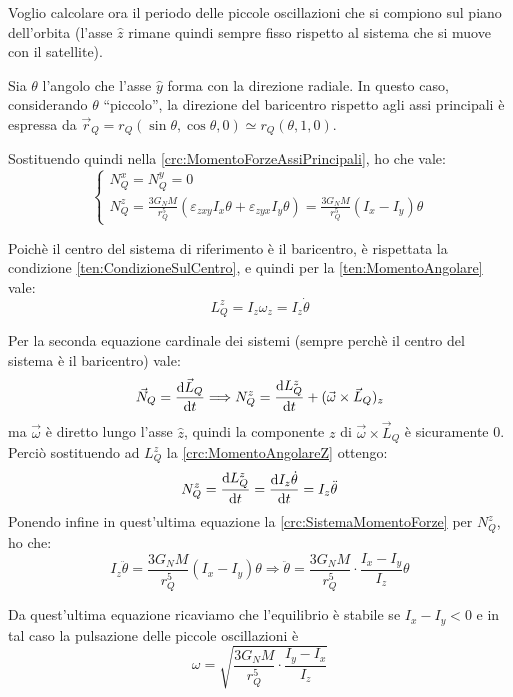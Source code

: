 \documentclass[../main.tex]{subfiles}
\begin{document}
Voglio calcolare ora il periodo delle piccole oscillazioni che si compiono sul piano dell'orbita (l'asse $\hat z$ rimane quindi sempre fisso rispetto al sistema che si muove con il satellite).

Sia $\theta$ l'angolo che l'asse $\hat y$ forma con la direzione radiale. In questo caso, considerando $\theta$ ``piccolo'', la direzione del baricentro rispetto agli assi principali è espressa da $\vec r_Q=r_Q(\sin\theta,\cos\theta,0)\simeq r_Q(\theta,1,0)$.

Sostituendo quindi nella \cref{crc:MomentoForzeAssiPrincipali}, ho che vale:
\begin{equation}\label{crc:SistemaMomentoForze}
\begin{cases}
	N_Q^x=N_Q^y=0\\
	N_Q^z=\frac{3G_N M}{r_Q^5} (\varepsilon_{zxy} I_{x}\theta +\varepsilon_{zyx} I_{y}\theta)=\frac{3G_N M}{r_Q^5}(I_x-I_y)\theta
\end{cases}
\end{equation}

Poichè il centro del sistema di riferimento è il baricentro, è rispettata la condizione \cref{ten:CondizioneSulCentro}, e quindi per la \cref{ten:MomentoAngolare} vale:
\begin{equation}\label{crc:MomentoAngolareZ}
	L_Q^z=I_z\omega_z=I_z\dot\theta
\end{equation}

Per la seconda equazione cardinale dei sistemi (sempre perchè il centro del sistema è il baricentro) vale:
\begin{equation*}
	\vec N_Q=\frac{\mathrm{d} \vec L_Q}{\mathrm{d} t} \Longrightarrow N_Q^z=\frac{\mathrm{d} L_Q^z}{\mathrm{d} t}+(\vec \omega \times \vec L_Q)_z
\end{equation*}
ma $\vec \omega$ è diretto lungo l'asse $\hat z$, quindi la componente $z$ di $\vec \omega \times \vec L_Q$ è sicuramente 0. Perciò sostituendo ad $L_Q^z$ la \cref{crc:MomentoAngolareZ} ottengo:
\begin{equation*}
	N_Q^z=\frac{\mathrm{d} L_Q^z}{\mathrm{d} t}=\frac{\mathrm{d} I_z\dot\theta}{\mathrm{d} t}=I_z\ddot\theta
\end{equation*}
Ponendo infine in quest'ultima equazione la \cref{crc:SistemaMomentoForze} per $N_Q^z$, ho che:
\begin{equation*}
	I_z\ddot\theta=\frac{3G_N M}{r_Q^5}(I_x-I_y)\theta \Longrightarrow \ddot\theta=\frac{3G_N M}{r_Q^5}\cdot\frac{I_x-I_y}{I_z}\theta
\end{equation*}

Da quest'ultima equazione ricaviamo che l'equilibrio è stabile se $I_x-I_y<0$ e in tal caso la pulsazione delle piccole oscillazioni è
\begin{equation*}
	\omega=\sqrt{\frac{3G_N M}{r_Q^5}\cdot\frac{I_y-I_x}{I_z}}
\end{equation*}
\end{document}
